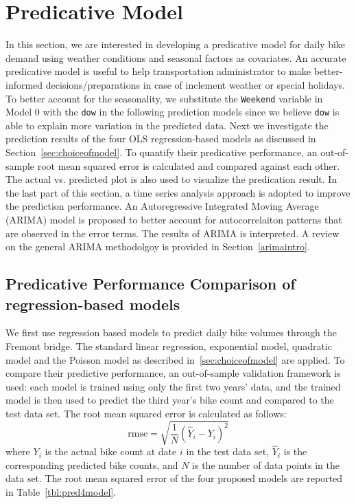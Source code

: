 \documentclass [11pt, proquest] {uwthesis}[2015/03/03]
\begin{document}


\section{Predicative Model}

In this section, we are interested in developing a predicative model for daily bike demand using weather conditions and seasonal factors as covariates. An accurate predicative model is useful to help transportation administrator to make better-informed decisions/preparations in case of inclement weather or special holidays. To better account for the seasonality, we substitute the \texttt{Weekend} variable in Model 0 with the \texttt{dow} in the following prediction models since we believe \texttt{dow} is able to explain more variation in the predicted data. Next we investigate the prediction results of the four OLS regression-based models as discussed in Section~\ref{sec:choiceofmodel}. To quantify their predicative performance, an out-of-sample root mean squared error is calculated and compared against each other. The actual vs. predicted plot is also used to visualize the predication result. In the last part of this section, a time series analysis approach is adopted to improve the prediction performance. An Autoregressive Integrated Moving Average (ARIMA) model is proposed to better account for autocorrelaiton patterns that are observed in the error terms. The results of ARIMA is interpreted. A review on the general ARIMA methodolgoy is provided in Section~\ref{arimaintro}.

\subsection{Predicative Performance Comparison of regression-based models}
We first use regression based models to predict daily bike volumes through the Fremont bridge. The standard linear regression, exponential model, quadratic model and the Poisson model as described in~\ref{sec:choiceofmodel} are applied. To compare their predictive performance, an out-of-sample validation framework is used: each model is trained using only the first two years' data, and the trained model is then used to predict the third year's bike count and compared to the test data set. The root mean squared error is calculated as follows:
\begin{equation*}
\text{rmse} = \sqrt{\frac{1}{N}(\hat{Y}_i - Y_i)^2}
\end{equation*}
where $Y_i$ is the actual bike count at date $i$ in the test data set, $\hat{Y}_i$ is the corresponding predicted bike counts, and $N$ is the number of data points in the data set. The root mean squared error of the four proposed models are reported in Table~\ref{tbl:pred4model}.
\end{document}
